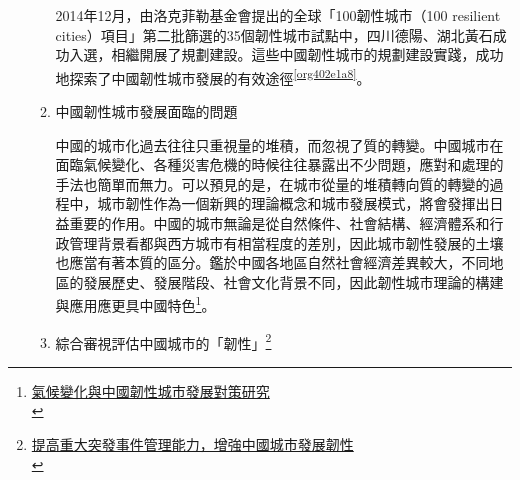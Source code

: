 \documentclass[a4paper,12pt]{article}
\begin{document}
\begin{enumerate}
\begin{enumerate}
2014年12月，由洛克菲勒基金會提出的全球「100韌性城市（100 resilient cities）項目」第二批篩選的35個韌性城市試點中，四川德陽、湖北黃石成功入選，相繼開展了規劃建設。這些中國韌性城市的規劃建設實踐，成功地探索了中國韌性城市發展的有效途徑\textsuperscript{\ref{org402e1a8}}。\\

\item 中國韌性城市發展面臨的問題
\label{sec:org67d13d9}

中國的城市化過去往往只重視量的堆積，而忽視了質的轉變。中國城市在面臨氣候變化、各種災害危機的時候往往暴露出不少問題，應對和處理的手法也簡單而無力。可以預見的是，在城市從量的堆積轉向質的轉變的過程中，城市韌性作為一個新興的理論概念和城市發展模式，將會發揮出日益重要的作用。中國的城市無論是從自然條件、社會結構、經濟體系和行政管理背景看都與西方城市有相當程度的差別，因此城市韌性發展的土壤也應當有著本質的區分。鑑於中國各地區自然社會經濟差異較大，不同地區的發展歷史、發展階段、社會文化背景不同，因此韌性城市理論的構建與應用應更具中國特色\footnote{\href{https://www.sanmin.com.tw/Product/Index/006005940}{氣候變化與中國韌性城市發展對策研究}\\}。\\

\item 綜合審視評估中國城市的「韌性」\footnote{\href{https://www.google.com/url?sa=t\&rct=j\&q=\&esrc=s\&source=web\&cd=\&cad=rja\&uact=8\&ved=2ahUKEwin1OfxgcTvAhVmHKYKHZ3HBdgQFjAAegQIBRAD\&url=https\%3A\%2F\%2Fwww.pwccn.com\%2Fzh\%2Fconsulting\%2Fpublications\%2Fresilient-city.pdf\&usg=AOvVaw3Hqz75zjZH72R-USxTaGjH}{提高重大突發事件管理能力，增強中國城市發展韌性}\\}
\label{sec:org936b7d7}


\end{enumerate}
\end{enumerate}
\end{document}
